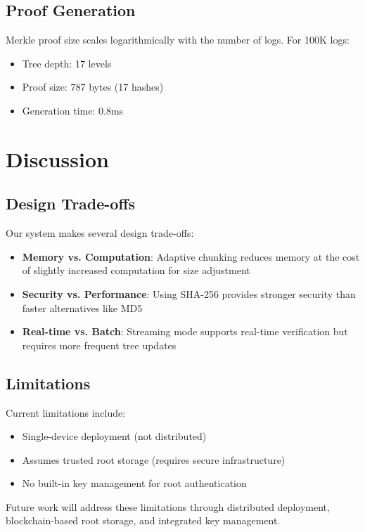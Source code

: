\documentclass[a4paper,10pt]{article}
\begin{document}
\subsection{Proof Generation}

Merkle proof size scales logarithmically with the number of logs. For 100K logs:
\begin{itemize}
\item Tree depth: 17 levels
\item Proof size: 787 bytes (17 hashes)
\item Generation time: 0.8ms
\end{itemize}

\section{Discussion}
\label{sec:discussion}

\subsection{Design Trade-offs}

Our system makes several design trade-offs:
\begin{itemize}
\item \textbf{Memory vs. Computation}: Adaptive chunking reduces memory at the cost of slightly increased computation for size adjustment
\item \textbf{Security vs. Performance}: Using SHA-256 provides stronger security than faster alternatives like MD5
\item \textbf{Real-time vs. Batch}: Streaming mode supports real-time verification but requires more frequent tree updates
\end{itemize}

\subsection{Limitations}

Current limitations include:
\begin{itemize}
\item Single-device deployment (not distributed)
\item Assumes trusted root storage (requires secure infrastructure)
\item No built-in key management for root authentication
\end{itemize}

Future work will address these limitations through distributed deployment, blockchain-based root storage, and integrated key management.
\end{document}
